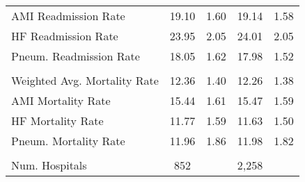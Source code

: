 \begin{table}[ht!]
\begin{tabular}[t]{lcccc}
\hspace{1em}AMI Readmission Rate & 19.10 & 1.60 & 19.14 & 1.58\\
\hspace{1em}HF Readmission Rate & 23.95 & 2.05 & 24.01 & 2.05\\
\hspace{1em}Pneum. Readmission Rate & 18.05 & 1.62 & 17.98 & 1.52\\
\addlinespace[0.3em]
\multicolumn{5}{l}{\textbf{Mortality Outcome Variables}}\\
\hspace{1em}Weighted Avg. Mortality Rate & 12.36 & 1.40 & 12.26 & 1.38\\
\hspace{1em}AMI Mortality Rate & 15.44 & 1.61 & 15.47 & 1.59\\
\hspace{1em}HF Mortality Rate & 11.77 & 1.59 & 11.63 & 1.50\\
\hspace{1em}Pneum. Mortality Rate & 11.96 & 1.86 & 11.98 & 1.82\\
\\
Num. Hospitals & 852 &  & 2,258 & \\
\bottomrule
\end{tabular}
\end{table}
